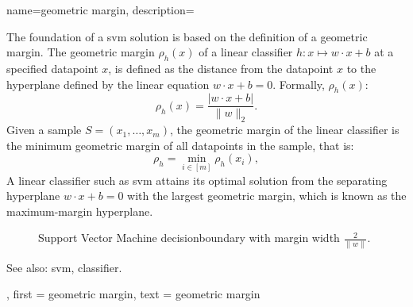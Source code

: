 {name={geometric margin}, 
description={The foundation of a \gls{svm} solution is based on the definition of a geometric margin. The geometric margin $\rho_h(x)$ of a linear \gls{classifier}
$h: x \mapsto w \cdot x + b$ at a specified \gls{datapoint} $x$, is defined as the distance from the \gls{datapoint} $x$ to the hyperplane defined by the linear equation $w \cdot x + b = 0$. Formally, $\rho_h(x)$: 
\begin{equation}
    \rho_h(x) = \frac{|w \cdot x + b|}{\|w\|_2}.
    \label{eq:geometric_margin_point}
\end{equation}
Given a sample $S = (x_1, \ldots, x_m)$, the geometric margin of the linear \gls{classifier} is the \gls{minimum} geometric margin of all \glspl{datapoint} in the sample, that is: 
\begin{equation}
    \rho_h = \min_{i \in [m]} \rho_h(x_i),
    \label{eq:geometric_margin_sample}
\end{equation}
A linear \gls{classifier} such as \gls{svm} attains its optimal solution from the separating hyperplane $w \cdot x + b = 0$ with the largest geometric margin, which is known as 
the \gls{maximum}-margin hyperplane.  
\cite{mohri2018foundations}
 \\
 \begin{figure}[H]
	\begin{center}
	\end{center}
    \caption{Support Vector Machine \gls{decisionboundary} with margin width $\tfrac{2}{\|w\|}$.}
	\label{fig:geometric-margin}
	\end{figure}
 		See also: \gls{svm}, \gls{classifier}.}, 
  first = {geometric margin}, 
  text = {geometric margin}
 }


